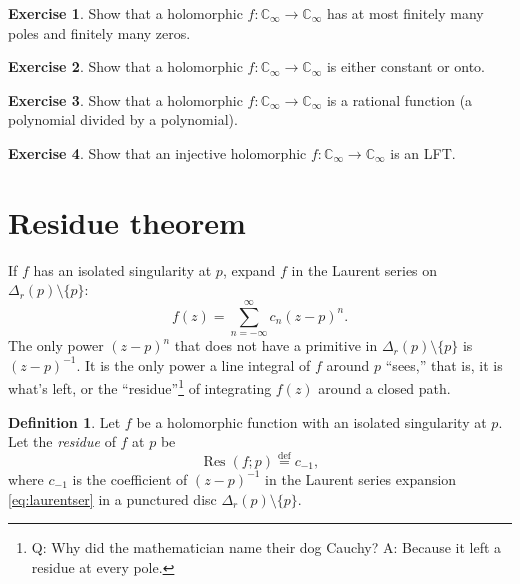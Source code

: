 \documentclass[12pt,openany]{book}
\newcommand{\C}{{\mathbb{C}}}
\newcommand{\myindex}[1]{#1\index{#1}}
\newcommand{\myquote}[1]{``#1''}
\theoremstyle{plain}
\theoremstyle{remark}
\theoremstyle{definition}
\newtheorem{defn}[thm]{Definition}
\newenvironment{exbox}{%
    \def\FrameCommand{\vrule width 1pt \relax\hspace{10pt}}%
    \MakeFramed{\advance\hsize-\width\FrameRestore}%
}{%
    \endMakeFramed
}
\theoremstyle{exercise}
\newtheorem{exercise}{Exercise}[section]
\theoremstyle{example}
\begin{document}
\begin{exbox}
\begin{exercise}
Show that a holomorphic $f \colon \C_\infty \to \C_\infty$ has
at most finitely many poles and finitely many zeros.
\end{exercise}

\begin{exercise}
Show that a holomorphic $f \colon \C_\infty \to \C_\infty$ is
either constant or onto.
\end{exercise}

\begin{exercise}
Show that a holomorphic $f \colon \C_\infty \to \C_\infty$ is a
rational function (a polynomial divided by a polynomial).
\end{exercise}

\begin{exercise}
Show that an injective holomorphic $f \colon \C_\infty \to \C_\infty$ is an
LFT\@.
\end{exercise}
\end{exbox}


\section{Residue theorem}

If $f$ has an isolated singularity at $p$,
expand
$f$ in the Laurent series on $\Delta_r(p) \setminus \{ p \}$:
\begin{equation} \label{eq:laurentser}
f(z) = \sum_{n=-\infty}^\infty c_n {(z-p)}^n .
\end{equation}
The only power ${(z-p)}^n$ that does not have a primitive in
$\Delta_r(p) \setminus \{ p \}$ is ${(z-p)}^{-1}$.  It is the only power
a line integral of $f$ around $p$ \myquote{sees,} that is, it is
what's left, or the \myquote{residue}\footnote{%
Q\@: Why did the mathematician name their dog Cauchy?
A\@: Because it left a residue at every pole.}
of integrating $f(z)$ around a closed path.

\begin{defn}
Let $f$ be a holomorphic function
with an isolated singularity at $p$.
Let the \emph{\myindex{residue}} of $f$ at $p$ be
%
\begin{equation*}
\operatorname{Res}(f;p)
\overset{\text{def}}{=}
c_{-1} ,
\end{equation*}
where $c_{-1}$ is the coefficient of ${(z-p)}^{-1}$ in the Laurent series
expansion \eqref{eq:laurentser} in a punctured disc $\Delta_r(p) \setminus \{ p \}$.
\end{defn}
\end{document}
